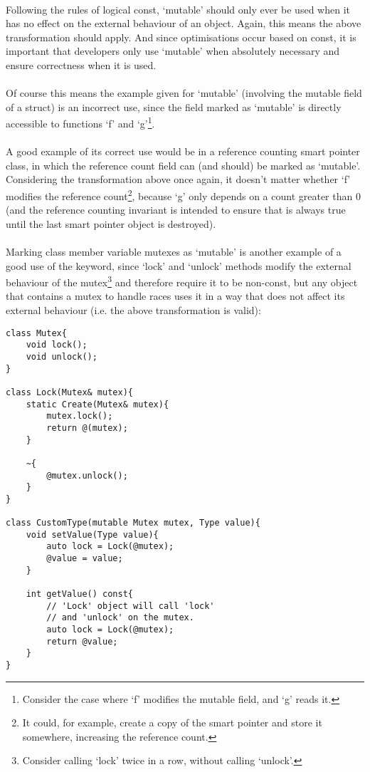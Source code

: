 \documentclass[12pt,twoside,notitlepage]{report}
\begin{document}
\paragraph{}
Following the rules of logical const, `mutable' should only ever be used when it has no effect on the external behaviour of an object. Again, this means the above transformation should apply. And since optimisations occur based on const, it is important that developers only use `mutable' when absolutely necessary and ensure correctness when it is used.

\paragraph{}
Of course this means the example given for `mutable' (involving the mutable field of a struct) is an incorrect use, since the field marked as `mutable' is directly accessible to functions `f' and `g'\footnote{Consider the case where `f' modifies the mutable field, and `g' reads it.}.

\paragraph{}
A good example of its correct use would be in a reference counting smart pointer class, in which the reference count field can (and should) be marked as `mutable'. Considering the transformation above once again, it doesn't matter whether `f' modifies the reference count\footnote{It could, for example, create a copy of the smart pointer and store it somewhere, increasing the reference count.}, because `g' only depends on a count greater than 0 (and the reference counting invariant is intended to ensure that is always true until the last smart pointer object is destroyed).

\paragraph{}
Marking class member variable mutexes as `mutable' is another example of a good use of the keyword, since `lock' and `unlock' methods modify the external behaviour of the mutex\footnote{Consider calling `lock' twice in a row, without calling `unlock'.} and therefore require it to be non-const, but any object that contains a mutex to handle races uses it in a way that does not affect its external behaviour (i.e. the above transformation is valid):

\begin{lstlisting}
class Mutex{
	void lock();
	void unlock();
}

class Lock(Mutex& mutex){
	static Create(Mutex& mutex){
		mutex.lock();
		return @(mutex);
	}
	
	~{
		@mutex.unlock();
	}
}

class CustomType(mutable Mutex mutex, Type value){
	void setValue(Type value){
		auto lock = Lock(@mutex);
		@value = value;
	}

	int getValue() const{
		// 'Lock' object will call 'lock'
		// and 'unlock' on the mutex.
		auto lock = Lock(@mutex);
		return @value;
	}
}
\end{lstlisting}
\end{document}
